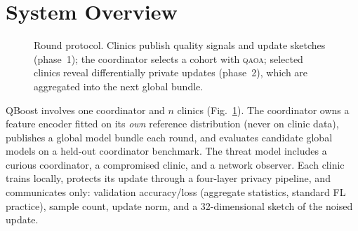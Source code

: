 \documentclass[conference]{IEEEtran}
\newcommand{\qaoa}{\textsc{qaoa}}
\begin{document}
\section{System Overview}\label{sec:system}
\begin{figure}[t]
\centering
{}
\caption{Round protocol. Clinics publish quality signals and update sketches
(phase~1); the coordinator selects a cohort with \qaoa{}; selected clinics
reveal differentially private updates (phase~2), which are aggregated into the
next global bundle.}
\label{fig:arch}
\end{figure}

QBoost involves one coordinator and $n$ clinics (Fig.~\ref{fig:arch}). The
coordinator owns a feature encoder fitted on its \emph{own} reference
distribution (never on clinic data), publishes a global model bundle each
round, and evaluates candidate global models on a held-out coordinator
benchmark. The threat model includes a curious coordinator, a compromised
clinic, and a network observer. Each clinic trains locally, protects its
update through a four-layer privacy pipeline, and communicates only:
validation accuracy/loss (aggregate statistics, standard FL practice), sample
count, update norm, and a 32-dimensional sketch of the noised update.
\end{document}
